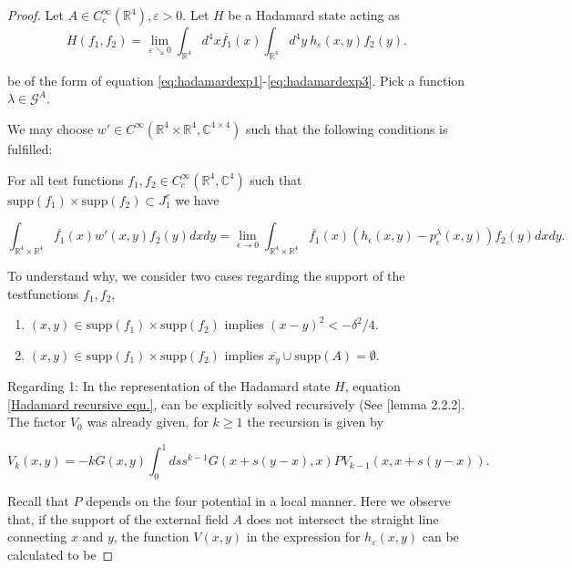 \documentclass[b5paper,draft,openbib,12pt]{memoir}
\begin{document}
\begin{proof}
Let \(A\in C_c^\infty(\mathbb{R}^4), \varepsilon>0\).
  Let \(H\) be a Hadamard state acting as 
\begin{equation}
H(f_1,f_2)=\lim_{\varepsilon\searrow 0} \int_{\mathbb{R}^4}d^4 x \overline{f_1}(x) \int_{\mathbb{R}^4} d^4y ~h_\varepsilon(x,y) f_2(y).
\end{equation}

be of the form of equation \eqref{eq:hadamardexp1}-\eqref{eq:hadamardexp3}. 
Pick a function \(\lambda\in \mathcal{G}^A\). 

We may choose \(w'\in C^\infty(\mathbb{R}^4\times\mathbb{R}^4,\mathbb{C}^{4\times 4})\)
such that the following conditions is fulfilled:

For all test functions \(f_1,f_2\in C_c^\infty(\mathbb{R}^4,\mathbb{C}^4)\) such that \( \mathrm{supp}(f_1)\times \mathrm{supp}(f_2) \subset J_1^c \)
we have

\begin{equation}\label{eq:conditionfull}
\int_{\mathbb{R}^4\times\mathbb{R}^4} \overline{f_1}(x) w'(x,y)f_2(y)dxdy =
\lim_{\epsilon\rightarrow 0}\int_{\mathbb{R}^4\times\mathbb{R}^4} \overline{f_1}(x)(h_\epsilon (x,y)-p^\lambda_\epsilon(x,y)) f_2(y)dxdy.
\end{equation}

To understand why, we consider two cases regarding the support of the testfunctions \(f_1,f_2\), 
\begin{enumerate}
\item \((x,y)\in\mathrm{supp}(f_1)\times\mathrm{supp}(f_2)\)
implies \((x-y)^2<-\delta^2/4\).
\item \((x,y)\in\mathrm{supp}(f_1)\times\mathrm{supp}(f_2)\)
implies \(\overline{x_y}\cup \mathrm{supp}(A)=\emptyset\).
\end{enumerate}

Regarding 1: In the representation of the Hadamard state \(H\), equation \eqref{Hadamard recursive equ.}, can be explicitly 
solved recursively (See \cite{bar2007wave}[lemma 2.2.2]. The factor \(V_0\) was already given, for \(k\ge 1\) the recursion is given by

\begin{equation}\label{eq:line integral}
V_k(x,y)=-k G(x,y) \int_0^1 ds s^{k-1} G(x+ s(y-x),x) P V_{k-1}(x,x+s(y-x)).
\end{equation}

Recall that \(P\) depends on the four potential in a local manner.
Here we observe  that, if the support of the external field \(A\) does not intersect the straight line connecting \(x\) and \(y\), the function
\(V(x,y)\) in the expression for \(h_\varepsilon(x,y)\) can be calculated to be


\end{proof}
\end{document}
